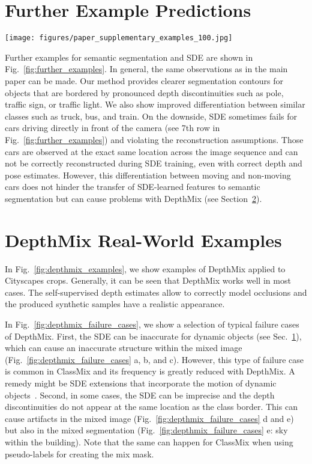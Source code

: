 \documentclass[final]{cvpr}
\begin{document}
\section{Further Example Predictions}
\label{sec:further_examples}

\begin{figure*}
    \centering
    \texttt{[image: figures/paper\_supplementary\_examples\_100.jpg]}
    \caption{Further example predictions for 100 annotated training samples including the self-supervised disparity estimate of the multi-task learning framework.}
    \label{fig:further_examples}
\end{figure*}

Further examples for semantic segmentation and SDE are shown in Fig.~\ref{fig:further_examples}. In general, the same observations as in the main paper can be made. Our method provides clearer segmentation contours for objects that are bordered by pronounced depth discontinuities such as pole, traffic sign, or traffic light. We also show improved differentiation between similar classes such as truck, bus, and train. On the downside, SDE sometimes fails for cars driving directly in front of the camera (see 7th row in Fig.~\ref{fig:further_examples}) and violating the reconstruction assumptions. Those cars are observed at the exact same location across the image sequence and can not be correctly reconstructed during SDE training, even with correct depth and pose estimates. However, this differentiation between moving and non-moving cars does not hinder the transfer of SDE-learned features to semantic segmentation but can cause problems with DepthMix (see Section~\ref{sec:depthmix_examples}).

\section{DepthMix Real-World Examples}
\label{sec:depthmix_examples}

In Fig.~\ref{fig:depthmix_examples}, we show examples of DepthMix applied to Cityscapes crops. Generally, it can be seen that DepthMix works well in most cases. The self-supervised depth estimates allow to correctly model occlusions and the produced synthetic samples have a realistic appearance. 


In Fig.~\ref{fig:depthmix_failure_cases}, we show a selection of typical failure cases of DepthMix. First, the SDE can be inaccurate for dynamic objects (see Sec.~\ref{sec:further_examples}), which can cause an inaccurate structure within the mixed image (Fig.~\ref{fig:depthmix_failure_cases} a, b, and c). However, this type of failure case is common in ClassMix and its frequency is greatly reduced with DepthMix. A remedy might be SDE extensions that incorporate the motion of dynamic objects~\cite{casser2019depth, dai2020self, klingner2020self}.
Second, in some cases, the SDE can be imprecise and the depth discontinuities do not appear at the same location as the class border. This can cause artifacts in the mixed image (Fig.~\ref{fig:depthmix_failure_cases} d and e) but also in the mixed segmentation (Fig.~\ref{fig:depthmix_failure_cases} e: sky within the building). Note that the same can happen for ClassMix when using pseudo-labels for creating the mix mask.
\end{document}
